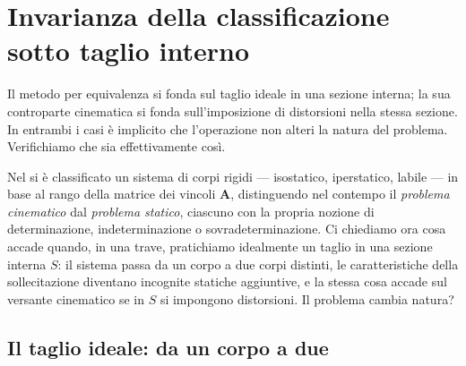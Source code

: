 \section{Invarianza della classificazione sotto taglio interno}
\label{sec:invarianza_classificazione}

Il metodo per equivalenza si fonda sul taglio ideale
in una sezione interna; la sua controparte cinematica
si fonda sull'imposizione di distorsioni nella stessa
sezione. In entrambi i casi è implicito che l'operazione
non alteri la natura del problema. Verifichiamo che sia
effettivamente così.

Nel  si è classificato
un sistema di corpi rigidi --- isostatico, iperstatico,
labile --- in base al rango della matrice dei vincoli
$\bm{A}$, distinguendo nel contempo il \emph{problema
	cinematico} dal \emph{problema statico}, ciascuno con
la propria nozione di determinazione, indeterminazione
o sovradeterminazione. Ci chiediamo ora cosa accade
quando, in una trave, pratichiamo idealmente un taglio
in una sezione interna $S$: il sistema passa da un
corpo a due corpi distinti, le caratteristiche della
sollecitazione diventano incognite statiche aggiuntive,
e la stessa cosa accade sul versante cinematico se in
$S$ si impongono distorsioni. Il problema cambia natura?

\subsection{Il taglio ideale: da un corpo a due}
\label{sec:taglio_ideale}

